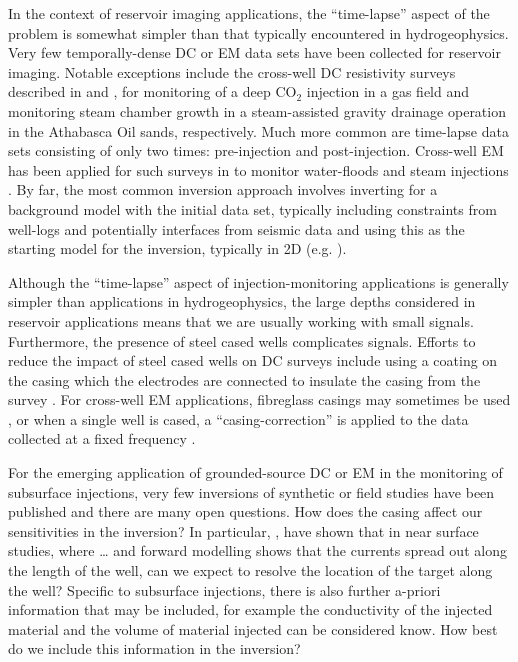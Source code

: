 In the context of reservoir imaging applications, the ``time-lapse'' aspect of the problem is somewhat simpler than that typically encountered in hydrogeophysics. Very few temporally-dense DC or EM data sets have been collected for reservoir imaging. Notable exceptions include the cross-well DC resistivity surveys described in \cite{Carrigan2013} and \cite{Tondel2014}, for monitoring of a deep CO$_2$ injection in a gas field and monitoring steam chamber growth in a steam-assisted gravity drainage operation in the Athabasca Oil sands, respectively. Much more common are time-lapse data sets consisting of only two times: pre-injection and post-injection. Cross-well EM has been applied for such surveys in to monitor water-floods \citep{Wilt2005, Wilt2012} and steam injections \citep{Wilt1996, Wilt1997, Marion2011}. By far, the most common inversion approach involves inverting for a background model with the initial data set, typically including constraints from well-logs and potentially interfaces from seismic data and using this as the starting model for the inversion, typically in 2D (e.g. \cite{Wilt2012}).

Although the ``time-lapse'' aspect of injection-monitoring applications is generally simpler than applications in hydrogeophysics, the large depths considered in reservoir applications means that we are usually working with small signals. Furthermore, the presence of steel cased wells complicates signals. Efforts to reduce the impact of steel cased wells on DC surveys include using a coating on the casing which the electrodes are connected to insulate the casing from the survey \citep{Tondel2014}. For cross-well EM applications, fibreglass casings may sometimes be used \citep{Wilt2012}, or when a single well is cased, a ``casing-correction'' is applied to the data collected at a fixed frequency \citep{Wu1993}.

For the emerging application of grounded-source DC or EM in the monitoring of subsurface injections, very few inversions of synthetic or field studies have been published and there are many open questions. How does the casing affect our sensitivities in the inversion? In particular, \cite{}, have shown that in near surface studies, where … and forward modelling shows that the currents spread out along the length of the well, can we expect to resolve the location of the target along the well? Specific to subsurface injections, there is also further a-priori information that may be included, for example the conductivity of the injected material and the volume of material injected can be considered know. How best do we include this information in the inversion?

